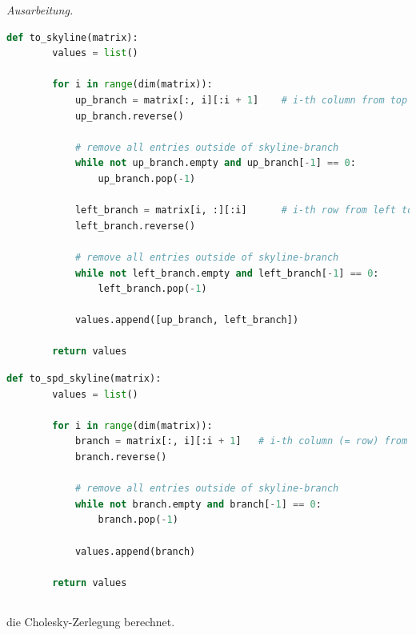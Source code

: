 \documentclass[titlepage]{article}
\newenvironment{ausarbeitung}{\vspace{3mm}\noindent\textit{Ausarbeitung.}}{}
\begin{document}
\begin{ausarbeitung}
	\begin{lstlisting}[language=Python, caption=Strukturerkennung einer nicht notwendigerweise symmetrischen Skyline-Matrix]
	def to_skyline(matrix):
		values = list()
	
		for i in range(dim(matrix)):
			up_branch = matrix[:, i][:i + 1]	# i-th column from top to diagonal
			up_branch.reverse()
 	    
			# remove all entries outside of skyline-branch
			while not up_branch.empty and up_branch[-1] == 0: 
				up_branch.pop(-1)
	
			left_branch = matrix[i, :][:i]		# i-th row from left to diagonal
			left_branch.reverse()
			
			# remove all entries outside of skyline-branch
			while not left_branch.empty and left_branch[-1] == 0:
				left_branch.pop(-1)
			
			values.append([up_branch, left_branch])
	
		return values
	\end{lstlisting}
	
	\begin{lstlisting}[language=Python, caption=Strukturerkennung einer symmetrischen positiv definiten Skyline-Matrix]
	def to_spd_skyline(matrix):
		values = list()
			
		for i in range(dim(matrix)):
			branch = matrix[:, i][:i + 1]	# i-th column (= row) from top to diagonal
			branch.reverse()
		
			# remove all entries outside of skyline-branch
			while not branch.empty and branch[-1] == 0:
				branch.pop(-1)
				
			values.append(branch)
			
		return values
	\end{lstlisting}
\end{ausarbeitung}


\subsection{}
die Cholesky-Zerlegung berechnet.
\end{document}
